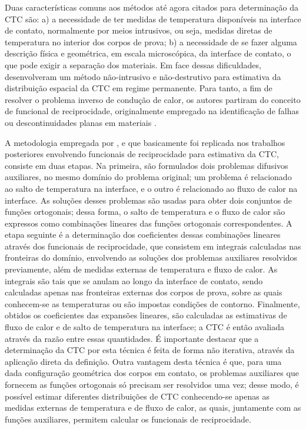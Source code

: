 Duas características comuns aos métodos até agora citados para determinação da CTC são: a) a necessidade de ter medidas de temperatura disponíveis na interface de contato,
normalmente por meios intrusivos, ou seja, medidas diretas de temperatura no interior dos corpos de prova; b) a necessidade de se fazer alguma descrição física e geométrica, em
escala microscópica, da interface de contato, o que pode exigir a separação dos materiais. Em face dessas dificuldades, \cite{reciproc_3} desenvolveram
um método não-intrusivo e não-destrutivo para estimativa da distribuição espacial da CTC em regime permanente. Para tanto, a fim de resolver o problema inverso de condução de calor, os autores partiram do conceito de funcional de reciprocidade, originalmente
empregado na identificação de falhas ou descontinuidades planas em materiais \citep{artigo_andrieux}.

A metodologia empregada por \cite{reciproc_3}, e que basicamente foi replicada nos trabalhos posteriores envolvendo funcionais de reciprocidade para estimativa
da CTC, consiste em duas etapas. Na primeira,
são formulados dois problemas difusivos auxiliares, no mesmo domínio do problema original; um problema é relacionado ao salto de temperatura na interface, e
o outro é relacionado ao fluxo de calor na interface. As soluções desses problemas são usadas para obter dois conjuntos de funções ortogonais; dessa forma,
o salto de temperatura e o fluxo de calor são expressos como combinações lineares das funções ortogonais correspondentes. A etapa seguinte é a determinação 
dos coeficientes dessas combinações lineares através dos funcionais de reciprocidade, que consistem em integrais calculadas nas fronteiras do domínio, envolvendo as soluções dos
problemas auxiliares resolvidos previamente, além de medidas externas de temperatura e fluxo de calor. As integrais são tais que
se anulam ao longo da interface de contato, sendo calculadas apenas nas fronteiras externas dos corpos de prova, sobre as quais conhecem-se as temperaturas
ou são impostas condições de contorno. Finalmente, obtidos os coeficientes das expansões lineares, são calculadas as estimativas de fluxo de calor e de salto de temperatura na interface;
a CTC é então avaliada através da razão entre essas quantidades. É importante destacar que a determinação da CTC por esta técnica é feita de forma não iterativa,
através da aplicação direta da definição. Outra vantagem desta técnica é que, para uma dada configuração geométrica dos corpos em contato, os problemas auxiliares que
fornecem as funções ortogonais só precisam ser resolvidos uma vez; desse modo, é possível estimar diferentes distribuições de CTC conhecendo-se apenas as medidas externas de temperatura
e de fluxo de calor, as quais, juntamente com as funções auxiliares, permitem calcular os funcionais de reciprocidade.

